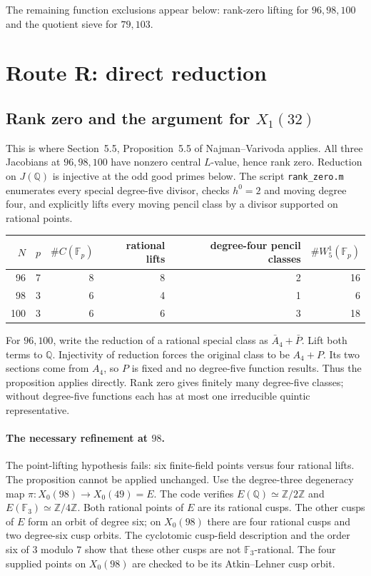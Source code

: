 \documentclass[11pt,a4paper]{article}
\newcommand{\Q}{\mathbb Q}
\newcommand{\F}{\mathbb F}
\newcommand{\Z}{\mathbb Z}
\begin{document}
The remaining function exclusions appear below: rank-zero lifting for
$96,98,100$ and the quotient sieve for $79,103$.

\section{Route R: direct reduction}\label{sec:direct}
\subsection{Rank zero and the argument for \texorpdfstring{$X_1(32)$}{X1(32)}}
This is where Section~5.5, Proposition~5.5 of Najman--Varivoda
\cite{NV} applies. All three Jacobians at $96,98,100$ have nonzero
central $L$-value, hence rank zero. Reduction on $J(\Q)$ is injective
at the odd good primes below.
The script \texttt{rank\_zero.m} enumerates every special degree-five
divisor, checks $h^0=2$ and moving degree four, and explicitly lifts
every moving pencil class by a divisor supported on rational points.
\begin{center}\small
\begin{tabular}{@{}rrrrrr@{}}
\toprule
$N$&$p$&$\#C(\F_p)$&rational lifts&degree-four pencil classes&
$\#W^1_5(\F_p)$\\
\midrule
96&7&8&8&2&16\\
98&3&6&4&1&6\\
100&3&6&6&3&18\\
\bottomrule
\end{tabular}
\end{center}
For $96,100$, write the reduction of a rational special class as
$\bar A_4+\bar P$. Lift both terms to $\Q$. Injectivity of reduction
forces the original class to be $A_4+P$. Its two sections come from
$A_4$, so $P$ is fixed and no degree-five function results.
Thus the proposition applies directly. Rank zero gives finitely many
degree-five classes; without degree-five functions each has at most one
irreducible quintic representative.

\paragraph{The necessary refinement at $98$.}
The point-lifting hypothesis fails: six finite-field points versus four
rational lifts. The proposition cannot be applied unchanged.
Use the degree-three degeneracy map
$\pi:X_0(98)\to X_0(49)=E$.
The code verifies $E(\Q)\simeq\Z/2\Z$ and
$E(\F_3)\simeq\Z/4\Z$.
Both rational points of $E$ are its rational cusps.
The other cusps of $E$ form an orbit of degree six; on $X_0(98)$
there are four rational cusps and two degree-six cusp orbits.
The cyclotomic cusp-field description and the order six of $3$ modulo
$7$ show that these other cusps are not $\F_3$-rational.
The four supplied points on $X_0(98)$ are checked to be its
Atkin--Lehner cusp orbit.
\end{document}
